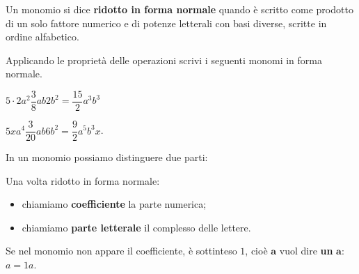 \begin{definizione}{}{}
Un monomio si dice \textbf{ridotto in forma normale}
 quando è scritto come 
prodotto di un solo fattore numerico e di potenze letterali con basi 
diverse, scritte in ordine alfabetico.
\end{definizione}

\begin{esempio}{}{}
Applicando le proprietà delle operazioni scrivi i seguenti monomi in 
forma normale.

\begin{enumerate*} 
\item \quad
\(5 \cdot 2a^{2} \dfrac{3}{8}ab2b^{2} = \dfrac{15}{2}a^3b^3\) \qquad~
\item \quad
\(5 x a^{4}\dfrac{3}{20}ab6b^{2} = \dfrac{9}{2}a^{5}b^{3}x\).
\end{enumerate*}
\end{esempio}



In un monomio possiamo distinguere due parti:

\begin{definizione}{}{}
Una volta ridotto in forma normale: 
\begin{itemize} [nosep]
\item chiamiamo \textbf{coefficiente}
la parte numerica;
\item chiamiamo \textbf{parte letterale} il complesso delle
lettere.
\end{itemize}
\end{definizione}

Se nel monomio non appare il coefficiente, è sottinteso \(1\), 
cioè \(\textbf{a}\) vuol dire \textbf{un} \(\mathbf{a}\):~~ \(a = 1a\).

